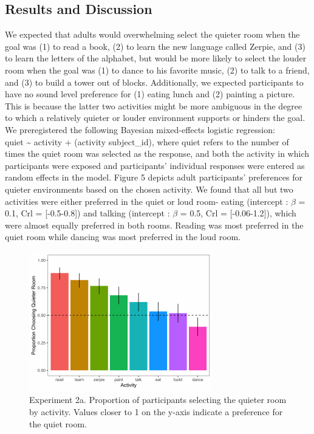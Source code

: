 \documentclass[10pt, letterpaper]{article}
\newenvironment{CodeChunk}{}{}
\begin{document}
\hypertarget{results-and-discussion-2}{%
\subsection{\texorpdfstring{\textbf{Results and
Discussion}}{Results and Discussion}}\label{results-and-discussion-2}}

We expected that adults would overwhelming select the quieter room when
the goal was (1) to read a book, (2) to learn the new language called
Zerpie, and (3) to learn the letters of the alphabet, but would be more
likely to select the louder room when the goal was (1) to dance to his
favorite music, (2) to talk to a friend, and (3) to build a tower out of
blocks. Additionally, we expected participants to have no sound level
preference for (1) eating lunch and (2) painting a picture. This is
because the latter two activities might be more ambiguous in the degree
to which a relatively quieter or louder environment supports or hinders
the goal. We preregistered the following Bayesian mixed-effects logistic
regression:\\
quiet \textasciitilde{} activity + (activity \textbar{} subject\_id),
where quiet refers to the number of times the quiet room was selected as
the response, and both the activity in which participants were exposed
and participants' individual responses were entered as random effects in
the model. Figure 5 depicts adult participants' preferences for quieter
environments based on the chosen activity. We found that all but two
activities were either preferred in the quiet or loud room- eating
(intercept : \(\beta\) = 0.1, Crl = {[}-0.5-0.8{]}) and talking
(intercept : \(\beta\) = 0.5, Crl = {[}-0.06-1.2{]}), which were almost
equally preferred in both rooms. Reading was most preferred in the quiet
room while dancing was most preferred in the loud room.

\begin{CodeChunk}
\begin{figure}[H]

{\centering \includegraphics{figs/image 5-1} 

}

\caption[Experiment 2a]{Experiment 2a. Proportion of participants selecting the quieter room by activity. Values closer to 1 on the y-axis indicate a preference for the quiet room.}\label{fig:image 5}
\end{figure}
\end{CodeChunk}
\end{document}
